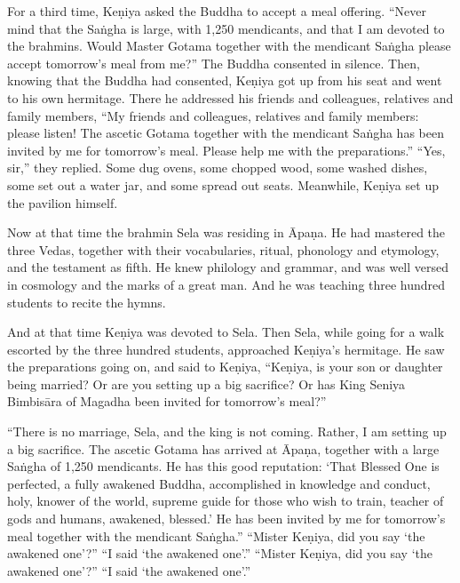 \documentclass[12pt,openany]{book}%
\begin{document}
For a third time, \textsanskrit{Keṇiya} asked the Buddha to accept a meal offering. “Never mind that the \textsanskrit{Saṅgha} is large, with 1,250 mendicants, and that I am devoted to the brahmins. Would Master Gotama together with the mendicant \textsanskrit{Saṅgha} please accept tomorrow’s meal from me?” The Buddha consented in silence. Then, knowing that the Buddha had consented, \textsanskrit{Keṇiya} got up from his seat and went to his own hermitage. There he addressed his friends and colleagues, relatives and family members, “My friends and colleagues, relatives and family members: please listen! The ascetic Gotama together with the mendicant \textsanskrit{Saṅgha} has been invited by me for tomorrow’s meal. Please help me with the preparations.” “Yes, sir,” they replied. Some dug ovens, some chopped wood, some washed dishes, some set out a water jar, and some spread out seats. Meanwhile, \textsanskrit{Keṇiya} set up the pavilion himself. 

Now at that time the brahmin Sela was residing in \textsanskrit{Āpaṇa}. He had mastered the three Vedas, together with their vocabularies, ritual, phonology and etymology, and the testament as fifth. He knew philology and grammar, and was well versed in cosmology and the marks of a great man. And he was teaching three hundred students to recite the hymns. 

And at that time \textsanskrit{Keṇiya} was devoted to Sela. Then Sela, while going for a walk escorted by the three hundred students, approached \textsanskrit{Keṇiya}’s hermitage. He saw the preparations going on, and said to \textsanskrit{Keṇiya}, “\textsanskrit{Keṇiya}, is your son or daughter being married? Or are you setting up a big sacrifice? Or has King Seniya \textsanskrit{Bimbisāra} of Magadha been invited for tomorrow’s meal?” 

“There is no marriage, Sela, and the king is not coming. Rather, I am setting up a big sacrifice. The ascetic Gotama has arrived at \textsanskrit{Āpaṇa}, together with a large \textsanskrit{Saṅgha} of 1,250 mendicants. He has this good reputation: ‘That Blessed One is perfected, a fully awakened Buddha, accomplished in knowledge and conduct, holy, knower of the world, supreme guide for those who wish to train, teacher of gods and humans, awakened, blessed.’ He has been invited by me for tomorrow’s meal together with the mendicant \textsanskrit{Saṅgha}.” “Mister \textsanskrit{Keṇiya}, did you say ‘the awakened one’?” “I said ‘the awakened one’.” “Mister \textsanskrit{Keṇiya}, did you say ‘the awakened one’?” “I said ‘the awakened one’.” 
\end{document}

